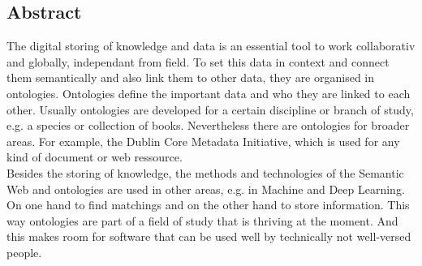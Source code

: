 %
\pagestyle{empty}

\subsection*{Abstract}

The digital storing of knowledge and data is an essential tool to work
collaborativ and globally, independant from  field. To set this data in context
and connect them semantically and also link them to other data, they are
organised in ontologies. Ontologies define the important data and who they are
linked to each other. Usually ontologies are developed for a certain discipline
or branch of study, e.g. a species or collection of books. Nevertheless there
are ontologies for broader areas. For example, the Dublin Core Metadata
Initiative, which is used for any kind of document or web ressource.\\
Besides the storing of knowledge, the methods and technologies of the Semantic
Web and ontologies are used in other areas, e.g. in Machine and Deep Learning.
On one hand to find matchings and on the other hand to store information. This
way ontologies are part of a field of study that is thriving at the moment. And
this makes room for software that can be used well by technically not
well-versed people. 

